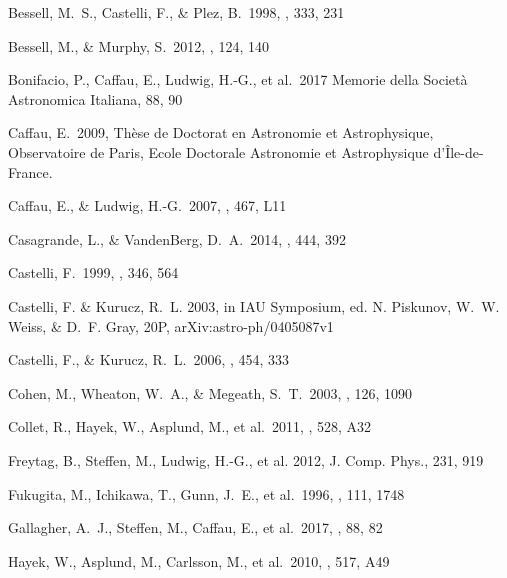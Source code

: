 \documentclass[]{aa}
\begin{document}

\begin{thebibliography}{}



 Bessell, M.~S., Castelli, F., \& Plez, B.\ 1998, \aap, 333, 231 

 Bessell, M., \& Murphy, S.\ 2012, \pasp, 124, 140 



Bonifacio, P., Caffau, E., Ludwig, H.-G., et al.\ 2017
Memorie della Societ\`{a} Astronomica Italiana, 88, 90  


 Caffau, E.\ 2009, Th{\`e}se de Doctorat
en Astronomie et Astrophysique, Observatoire de Paris, Ecole Doctorale 
Astronomie et Astrophysique d'{\^I}le-de-France.

 Caffau, E., \& Ludwig, H.-G.\ 2007, \aap, 467, L11 

 Casagrande, L., \& VandenBerg, D.~A.\ 2014, \mnras, 444, 392 

 Castelli, F.\ 1999, \aap, 346, 564 


 Castelli, F. \& 
{Kurucz}, 
R.~L. 2003, in IAU Symposium, ed. N. Piskunov,
W.~W. Weiss, \& D.~F. Gray, 20P, arXiv:astro-ph/0405087v1

 Castelli, F., \& Kurucz, R.~L.\ 2006, \aap, 454, 333 

 Cohen, M., Wheaton, 
W.~A., \& Megeath, S.~T.\ 2003, \aj, 126, 1090 

 Collet, R., Hayek, W., Asplund, M., et al.\ 2011, \aap, 528, A32 

Freytag, B., Steffen, M., Ludwig, H.-G., et al.
2012, J. Comp. Phys., 231, 919

 Fukugita, M., 
Ichikawa, T., Gunn, J.~E., et al.\ 1996, \aj, 111, 1748 


 Gallagher, A.~J., Steffen, M., Caffau, E., et al.\ 2017, \memsai, 88, 82 


 Hayek, W., Asplund, M., Carlsson, M., et al.\ 2010, \aap, 517, A49 


\end{thebibliography}
\end{document}
